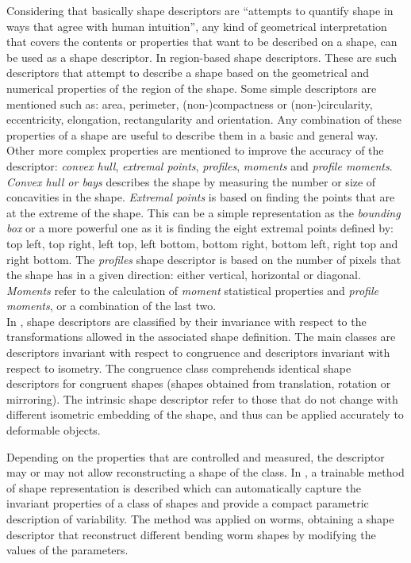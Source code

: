Considering that basically shape descriptors are ``attempts to quantify shape in 
ways that agree with human intuition''\cite[p.1]{desclecture}, any kind of 
geometrical interpretation that covers the contents or properties that want 
to be described on a shape, can be used as a shape descriptor.
In \cite{desclecture} region-based shape descriptors. These are such descriptors
that attempt to describe a shape based on the geometrical and numerical properties
of the region of the shape. Some simple descriptors are mentioned such as:
area, perimeter, (non-)compactness or (non-)circularity, eccentricity, elongation,
rectangularity and orientation. Any combination of these properties of a shape are
useful to describe them in a basic and general way.
Other more complex properties are mentioned to improve the accuracy of the 
descriptor: \emph{convex hull}, \emph{extremal points}, \emph{profiles}, 
\emph{ moments} and \emph{profile moments}. \emph{Convex hull or bays} 
describes the shape by measuring the number or size of concavities in the 
shape. \emph{Extremal points} is based on finding the points that
are at the extreme of the shape. This can be a simple representation as the 
\emph{bounding box} or a more powerful one as it is finding the eight extremal
points defined by: top left, top right, left top, left bottom, bottom right,
bottom left, right top and right bottom. The \emph{profiles} shape descriptor 
is based on the number of pixels that the shape has in a given direction:
 either vertical, horizontal or diagonal. \emph{Moments} refer to the
 calculation of \emph{moment} statistical properties and 
\emph{profile moments}, or a combination of the last two.\\
In \cite{web:wikishape}, shape descriptors are classified by their
invariance with respect to the transformations allowed in the associated
shape definition. The main classes are descriptors invariant with respect 
to congruence and descriptors invariant with respect to isometry. 
The congruence class
comprehends identical shape descriptors for congruent shapes 
(shapes obtained from
translation, rotation or mirroring). The intrinsic shape descriptor refer
to those that do not change with different isometric embedding of the shape,
and thus can be applied accurately to deformable objects.

Depending on the properties that are controlled and measured, the descriptor
may or may not allow reconstructing a shape of the class. In \cite{wormparam}, 
a trainable method of shape representation is described which can
automatically capture the invariant properties of a class of shapes and 
provide a compact parametric description of variability. The method was
applied on worms, obtaining a shape descriptor that reconstruct different
bending worm shapes by modifying the values of the parameters.\\

